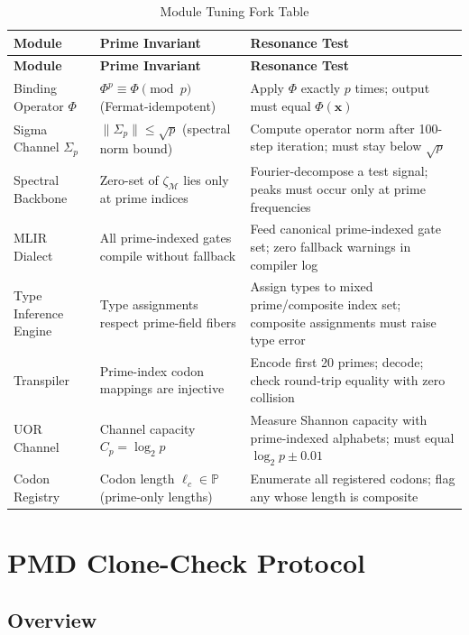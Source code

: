 \documentclass[12pt,letterpaper]{article}
\theoremstyle{definition}
\theoremstyle{remark}
\begin{document}
\begin{longtable}{lp{5.2cm}p{5.2cm}}
\caption{Module Tuning Fork Table} \\
\toprule
\textbf{Module} & \textbf{Prime Invariant} & \textbf{Resonance Test} \\
\midrule
\endfirsthead
\toprule
\textbf{Module} & \textbf{Prime Invariant} & \textbf{Resonance Test} \\
\midrule
\endhead
\bottomrule
\endfoot
Binding Operator $\Phi$ & $\Phi^p \equiv \Phi \pmod{p}$ (Fermat-idempotent) & Apply $\Phi$ exactly $p$ times; output must equal $\Phi(\mathbf{x})$ \\[4pt]
Sigma Channel $\Sigma_p$ & $\|\Sigma_p\| \leq \sqrt{p}$ (spectral norm bound) & Compute operator norm after 100-step iteration; must stay below $\sqrt{p}$ \\[4pt]
Spectral Backbone & Zero-set of $\zeta_\mathcal{M}$ lies only at prime indices & Fourier-decompose a test signal; peaks must occur only at prime frequencies \\[4pt]
MLIR Dialect & All prime-indexed gates compile without fallback & Feed canonical prime-indexed gate set; zero fallback warnings in compiler log \\[4pt]
Type Inference Engine & Type assignments respect prime-field fibers & Assign types to mixed prime/composite index set; composite assignments must raise type error \\[4pt]
Transpiler & Prime-index codon mappings are injective & Encode first 20 primes; decode; check round-trip equality with zero collision \\[4pt]
UOR Channel & Channel capacity $C_p = \log_2 p$ & Measure Shannon capacity with prime-indexed alphabets; must equal $\log_2 p \pm 0.01$ \\[4pt]
Codon Registry & Codon length $\ell_c \in \mathbb{P}$ (prime-only lengths) & Enumerate all registered codons; flag any whose length is composite \\
\end{longtable}

\section{PMD Clone-Check Protocol}

\subsection{Overview}
\end{document}
